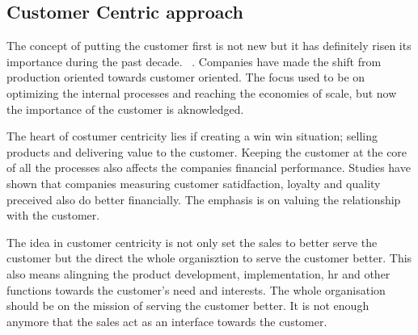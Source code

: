 \documentclass[12pt,a4paper,oneside,pdftex]{report}
\begin{document}
{{\subsection{Customer Centric approach}

The concept of putting the customer first is not new but it has definitely risen its importance during the past decade.  ~\citep{Shah}. Companies have made the shift from production oriented towards customer oriented. The focus used to be on optimizing the internal processes and reaching the economies of scale, but now the importance of the customer is aknowledged. 

The heart of costumer centricity lies if creating a win win situation; selling products and delivering value to the customer. \citep{Shah} Keeping the customer at the core of all the processes also affects the companies financial performance. Studies have shown that companies measuring customer satidfaction, loyalty and quality preceived also do better financially. The emphasis is on valuing the relationship with the customer. 

The idea in customer centricity is not only set the sales to better serve the customer but the direct the whole organisztion to serve the customer better. This also means alingning the product development, implementation, hr and other functions towards the customer's need and interests. The whole organisation should be on the mission of serving the customer better. It is not enough anymore that the sales act as an interface towards the customer. 
\newline

}}
\end{document}
